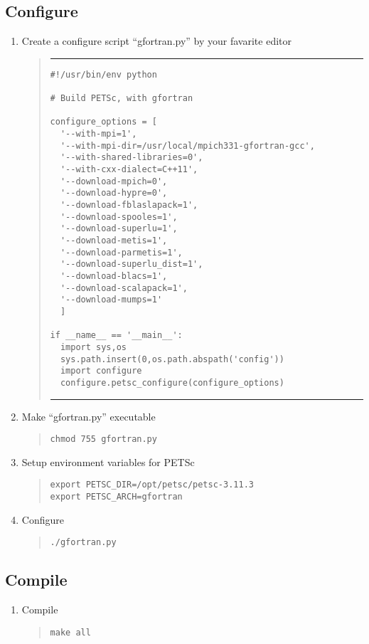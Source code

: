 \documentclass[11pt]{article}
\begin{document}
\subsection{Configure}
\begin{enumerate}
\item
Create a configure script ``gfortran.py'' by your favarite editor
\begin{quote}
\hrule
\begin{verbatim}
#!/usr/bin/env python

# Build PETSc, with gfortran

configure_options = [
  '--with-mpi=1',
  '--with-mpi-dir=/usr/local/mpich331-gfortran-gcc',
  '--with-shared-libraries=0',
  '--with-cxx-dialect=C++11',
  '--download-mpich=0',
  '--download-hypre=0',
  '--download-fblaslapack=1',
  '--download-spooles=1',
  '--download-superlu=1',
  '--download-metis=1',
  '--download-parmetis=1',
  '--download-superlu_dist=1',
  '--download-blacs=1',
  '--download-scalapack=1',
  '--download-mumps=1'
  ]

if __name__ == '__main__':
  import sys,os
  sys.path.insert(0,os.path.abspath('config'))
  import configure
  configure.petsc_configure(configure_options)
\end{verbatim}
\hrule
\end{quote}
\item
Make ``gfortran.py'' executable
\begin{quote}
\begin{verbatim}
chmod 755 gfortran.py
\end{verbatim}
\end{quote}
\item
Setup environment variables for PETSc
\begin{quote}
\begin{verbatim}
export PETSC_DIR=/opt/petsc/petsc-3.11.3
export PETSC_ARCH=gfortran
\end{verbatim}
\end{quote}
\item
Configure
\begin{quote}
\begin{verbatim}
./gfortran.py
\end{verbatim}
\end{quote}
\end{enumerate}

\subsection{Compile}
\begin{enumerate}
\item
Compile
\begin{quote}
\begin{verbatim}
make all
\end{verbatim}
\end{quote}
\end{enumerate}
\end{document}
